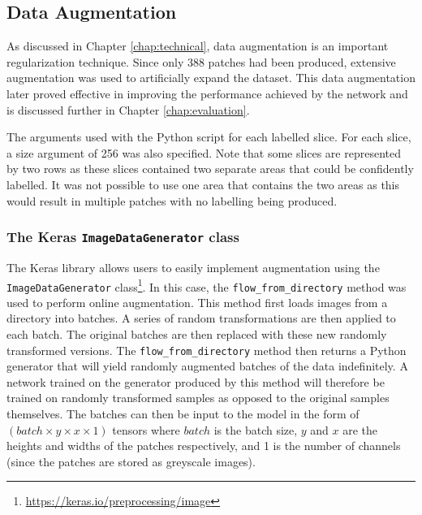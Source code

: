 \subsection{Data Augmentation}

As discussed in Chapter \ref{chap:technical}, data augmentation is an important regularization technique. Since only 388 patches had been produced, extensive augmentation was used to artificially expand the dataset. This data augmentation later proved effective in improving the performance achieved by the network and is discussed further in Chapter \ref{chap:evaluation}.

\begin{table}[!t]
\centering
\caption{The arguments used with the Python script for each labelled slice. For each slice, a size argument of 256 was also specified. Note that some slices are represented by two rows as these slices contained two separate areas that could be confidently labelled. It was not possible to use one area that contains the two areas as this would result in multiple patches with no labelling being produced.}

\label{tab:slidingwindow}
\end{table}

\subsubsection{The Keras \texttt{ImageDataGenerator} class}

The Keras library allows users to easily implement augmentation using the \texttt{ImageDataGenerator} class\footnote{\url{https://keras.io/preprocessing/image}}. In this case, the \texttt{flow\_from\_directory} method was used to perform online augmentation. This method first loads images from a directory into batches. A series of random transformations are then applied to each batch. The original batches are then replaced with these new randomly transformed versions. The \texttt{flow\_from\_directory} method then returns a Python generator that will yield randomly augmented batches of the data indefinitely. A network trained on the generator produced by this method will therefore be trained on randomly transformed samples as opposed to the original samples themselves. The batches can then be input to the model in the form of $(batch \times y \times x \times 1)$ tensors where $batch$ is the batch size, $y$ and $x$ are the heights and widths of the patches respectively, and 1 is the number of channels (since the patches are stored as greyscale images).

